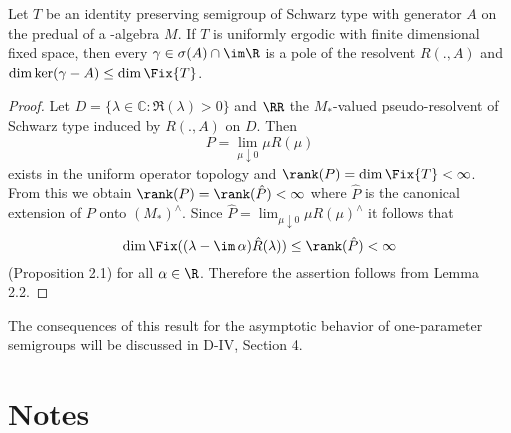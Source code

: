 \begin{theorem}\label{thm:d3-2.5}
Let $T$ be an identity preserving semigroup of Schwarz type with generator $A$ on the predual of a \WA-algebra $M$.
If $T$ is uniformly ergodic with finite dimensional fixed space, then every $\gamma \in \sigma(A) \cap \im\R$ is a pole of the resolvent $R(.,A)$ and $\dim \ker(\gamma - A) \leq \dim \Fix{T}$.
\end{theorem}

\begin{proof}
Let $D = \{\lambda \in \mathbb{C} \colon \Re(\lambda) > 0\}$ and $\RR$ the $M_{*}$-valued pseudo-resolvent of Schwarz type induced by $R(.,A)$ on $D$.
Then
\[
P = \lim_{\mu \downarrow 0}\mu R(\mu)
\]
exists in the uniform operator topology and $\rank(P) = \dim \Fix{T} < \infty$.
From this we obtain $\rank(P) = \rank(\hat{P}) < \infty$ where $\hat{P}$ is the canonical extension of $P$ onto $(M_{*})^{\wedge}$.
Since $\hat{P} = \lim_{\mu \downarrow 0} \mu R(\mu)^{\wedge}$ it follows that
\[
\dim \Fix((\lambda - \im\,\alpha)\hat{R}(\lambda)) \leq \rank(\hat{P}) < \infty
\]
(Proposition 2.1) for all $\alpha \in \R$.
Therefore the assertion follows from Lemma 2.2.
\end{proof}

The consequences of this result for the asymptotic behavior of one-parameter semigroups will be discussed in D-IV, Section 4.

\section*{Notes}\label{notes:d3-notes}


